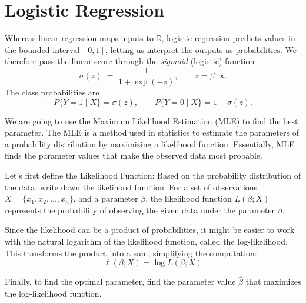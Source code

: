 \section{Logistic Regression}
\label{sec:logistic_regression}


Whereas linear regression maps inputs to $\mathbb{R}$, logistic regression
predicts values in the bounded interval $[0,1]$, letting us interpret the
outputs as probabilities.
We therefore pass the linear score through the \emph{sigmoid} (logistic)
function
\[
  \sigma(z) \;=\; \frac{1}{1+\exp(-z)}, 
  \qquad 
  z = \beta^{\!\top}\mathbf x .
\]
The class probabilities are
\[
  P\!\{Y=1\!\mid\!X\} = \sigma(z),
  \qquad
  P\!\{Y=0\!\mid\!X\} = 1 - \sigma(z).
\]

We are going to use the Maximum Likelihood Estimation (MLE) to find the best parameter. The MLE is a method used in statistics to estimate the parameters of a probability distribution by maximizing a likelihood function. Essentially, MLE finds the parameter values that make the observed data most probable.

Let's first define the Likelihood Function: Based on the probability distribution of the data, write down the likelihood function. For a set of observations \(X = \{x_1, x_2, \ldots, x_n\}\), and a parameter \(\beta\), the likelihood function \(L(\beta; X)\) represents the probability of observing the given data under the parameter \(\beta\).

Since the likelihood can be a product of probabilities, it might be easier to work with the natural logarithm of the likelihood function, called the log-likelihood. This transforms the product into a sum, simplifying the computation:
\[
\ell(\beta; X) = \log L(\beta; X)
\]

Finally, to find the optimal parameter, find the parameter value \(\hat{\beta}\) that maximizes the log-likelihood function.

